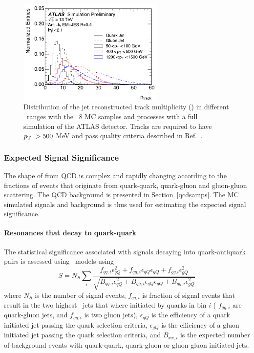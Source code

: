 \begin{figure}[htb]
 \centering
\includegraphics[width=0.65\textwidth]{fig/tagging/fig_01_ATL-PHYS-PUB-2017-009.pdf}
\caption{Distribution of the jet reconstructed track multiplicity (\ntrk ) in
 different \pt\ ranges with the \pythia~8 MC samples and processes with a full simulation of the
 ATLAS detector. Tracks are required to have $p_{\mathrm{T}}~> 500$ MeV and pass
  quality criteria described in Ref.~\cite{ATL-PHYS-PUB-2017-009}. }
\label{fig:jet_pt_quark_gluon}
\end{figure}


\subsubsection{Expected Signal Significance}

The shape of \mjj from QCD is complex and rapidly changing according to the fractions of events that originate from quark-quark, quark-gluon and gluon-gluon scattering. The QCD background is presented in Section~\ref{qcdsamps}. The MC simulated signals and background is thus used for estimating the expected signal significance.


\paragraph{Resonances that decay to quark-quark\\}

The statistical significance associated with signals decaying into quark-antiquark pairs is assessed using \Zprime\ models using 
\begin{equation}
	S = N_S \sum_i{ \dfrac{ f_{qq,i}\epsilon_{qQ}^2 + f_{qg,i}\epsilon_{qQ}\epsilon_{gQ} + f_{gg.i}\epsilon_{gQ}^2  } {\sqrt{ B_{qq,i}\epsilon_{qQ}^2 + B_{qg,i}\epsilon_{qQ}\epsilon_{gQ} + B_{gg,i}\epsilon_{gQ}^2  }}}
\end{equation}
where $N_S$ is the number of signal events, $f_{qq,i}$ is fraction of signal events that result in the two 
highest \pT\ jets that where initiated by quarks in bin $i$ ( $f_{qg,i}$ are quark-gluon jets, and $f_{gg,i}$ is two gluon jets), 
$\epsilon_{qQ}$ is the efficiency of a quark initiated jet passing the quark selection criteria, 
$\epsilon_{gQ}$ is the efficiency of a gluon initiated jet passing the quark selection criteria, 
and $B_{xx,i}$ is the expected number of background events with quark-quark, quark-gluon or gluon-gluon initiated jets. 


